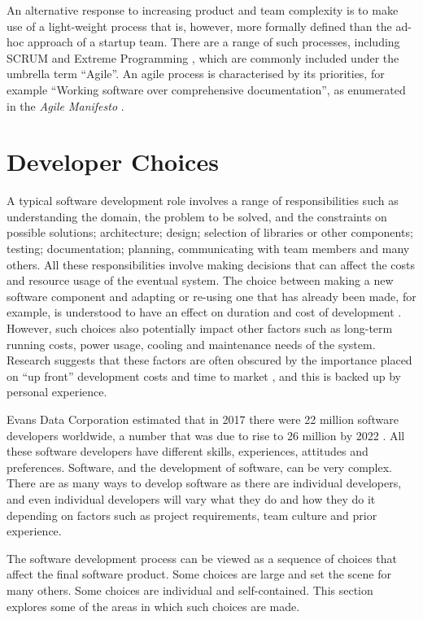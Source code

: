 An alternative response to increasing product and team complexity is to make use of a light-weight process that is, however, more formally defined than the ad-hoc approach of a startup team. There are a range of such processes, including SCRUM \citep{Schwaber1997} and Extreme Programming \citep{Beck2000}, which are commonly included under the umbrella term \enquote{Agile}. An agile process is characterised by its priorities, for example \enquote{Working software over comprehensive documentation}, as enumerated in the \emph{Agile Manifesto} \citep{Beck2001}.

\section{Developer Choices}
\label{subsection:developer choices}

A typical software development role involves a range of responsibilities such as understanding the domain, the problem to be solved, and the constraints on possible solutions; architecture; design; selection of libraries or other components; testing; documentation; planning, communicating with team members and many others. All these responsibilities involve making decisions that can affect the costs and resource usage of the eventual system. The choice between making a new software component and adapting or re-using one that has already been made, for example, is understood to have an effect on duration and cost of development \citep{Gacek2002}. However, such choices also potentially impact other factors such as long-term running costs, power usage, cooling and maintenance needs of the system. Research suggests that these factors are often obscured by the importance placed on \enquote{up front} development costs and time to market \citep{Petro2017}, and this is backed up by personal experience.

Evans Data Corporation estimated that in 2017 there were 22 million software developers worldwide, a number that was due to rise to 26 million by 2022 \citep{EvansDataCorporation2018}. All these software developers have different skills, experiences, attitudes and preferences. Software, and the development of software, can be very complex. There are as many ways to develop software as there are individual developers, and even individual developers will vary what they do and how they do it depending on factors such as project requirements, team culture and prior experience.

The software development process can be viewed as a sequence of choices that affect the final software product. Some choices are large and set the scene for many others. Some choices are individual and self-contained. This section explores some of the areas in which such choices are made.

